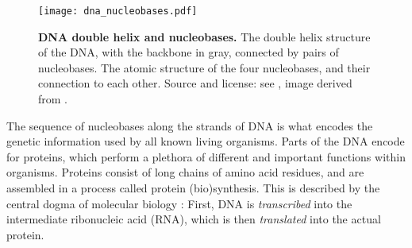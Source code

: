 \begin{figure}[hpbt]
    \centering
    \texttt{[image: dna\_nucleobases.pdf]}
    \begin{subfigure}{0pt}
        \label{fig:dna_nucleobases:sub:dna_helix}
    \end{subfigure}
    \begin{subfigure}{0pt}
        \label{fig:dna_nucleobases:sub:nucleobases}
    \end{subfigure}
    \caption[DNA double helix and nucleobases]{
        \textbf{DNA double helix and nucleobases.}
        The double helix structure of the DNA, with the backbone in gray,
        connected by pairs of nucleobases.
        The atomic structure of the four nucleobases, and their connection to each other.
        Source and license: see \cite{Czech2018DNA},
        image derived from \cite{MesserWoland2006,Sponk2010,Yikrazuul2008a,Yikrazuul2008b}.
    }
    \label{fig:dna_nucleobases}
\end{figure}


The sequence of nucleobases along the strands of DNA is what encodes the genetic information
used by all known living organisms.
Parts of the \ac{DNA} encode for proteins,
which perform a plethora of different and important functions within organisms.
Proteins consist of long chains of amino acid residues, and
are assembled in a process called protein (bio)synthesis.
This is described by the central dogma of molecular biology \cite{Crick1958,Crick1970}:
First, \ac{DNA} is \emph{transcribed} into the intermediate ribonucleic acid (RNA),
which is then \emph{translated} into the actual protein.

